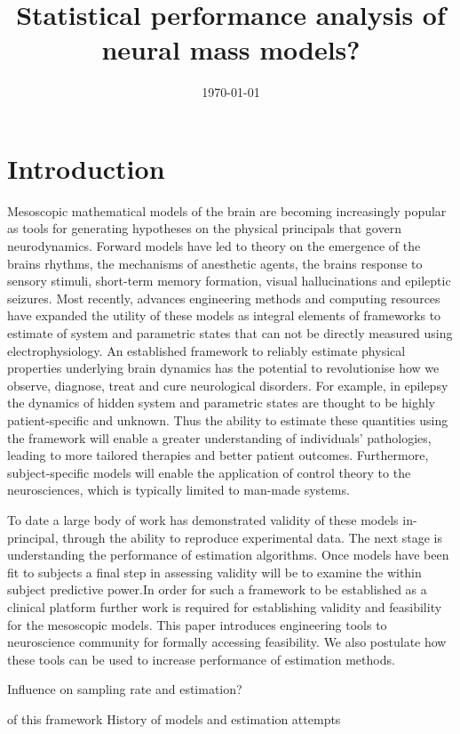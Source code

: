 \documentclass{article}
\title{Statistical performance analysis of neural mass models?}
\date{\today}
\begin{document}
\section{Introduction}
\label{sec:introduction}

Mesoscopic mathematical models of the brain are becoming increasingly popular as tools for generating hypotheses on the physical principals that govern neurodynamics. Forward models have led to theory on the emergence of the brains rhythms, the mechanisms of anesthetic agents, the brains response to sensory stimuli, short-term memory formation, visual hallucinations and epileptic seizures. Most recently, advances engineering methods and computing resources have expanded the utility of these models as integral elements of frameworks to estimate of system and parametric states that can not be directly measured using electrophysiology. An established framework to reliably estimate physical properties underlying brain dynamics has the potential to revolutionise how we observe, diagnose, treat and cure neurological disorders. For example, in epilepsy the dynamics of hidden system and parametric states are thought to be highly patient-specific and unknown. Thus the ability to estimate these quantities using the framework will enable a greater understanding of individuals’ pathologies, leading to more tailored therapies and better patient outcomes.  Furthermore, subject-specific models will enable the application of control theory to the neurosciences, which is typically limited to man-made systems.

To date a large body of work has demonstrated validity of these models in-principal, through the ability to reproduce experimental data. The next stage is understanding the performance of estimation algorithms. Once models have been fit to subjects a final step in assessing validity will be to examine the within subject predictive power.In order for such a framework to be established as a clinical platform further work is required for establishing validity and feasibility for the mesoscopic models. This paper introduces engineering tools to neuroscience community for formally accessing feasibility. We also postulate how these tools can be used to increase performance of estimation methods. 

Influence on sampling rate and estimation?


 


 of this framework History of models and estimation attempts
\end{document}
